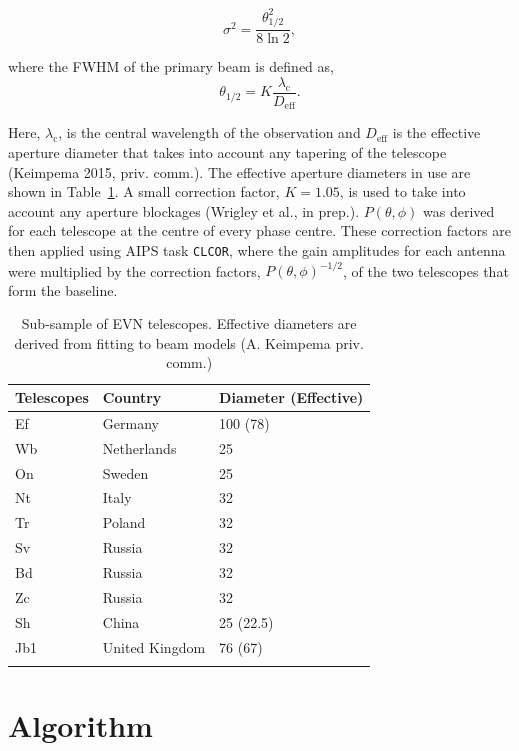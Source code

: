 \documentclass[idxtotoc,hyperref,openany]{article} %
\begin{document}
\begin{equation}
\sigma^2 = \frac{\theta_{1/2}^2}{8\ln{2}},
\end{equation} 

\noindent where the FWHM of the primary beam is defined as,
\begin{equation}
\theta_{1/2} = K\frac{\lambda_{\mathrm{c}}}{D_{\mathrm{eff}}}.
\end{equation}

\noindent Here, $\lambda_{\mathrm{c}}$, is the central wavelength of the observation and $D_{\mathrm{eff}}$ is the effective aperture diameter that takes into account any tapering of the telescope (Keimpema 2015, priv. comm.). The effective aperture diameters in use are shown in Table~\ref{table:telescopes}. A small correction factor, $K = 1.05$, is used to take into account any aperture blockages (Wrigley et al., in prep.). $P(\theta, \phi)$ was derived for each telescope at the centre of every phase centre. These correction factors are then applied using AIPS task \texttt{CLCOR}, where the gain amplitudes for each antenna were multiplied by the correction factors, $P(\theta, \phi)^{-1/2}$, of the two telescopes that form the baseline.

\begin{table}
	\centering  
	\begin{tabular}{lll}
		\hline\hline   \label{table:telescopes} 
		Telescopes & Country & Diameter (Effective)  \\
		\hline
		Ef & Germany & 100 (78) \\
		Wb & Netherlands & 25 \\
		On & Sweden & 25 \\
		Nt & Italy & 32 \\
		Tr & Poland & 32 \\
		Sv & Russia & 32 \\
		Bd & Russia & 32 \\
		Zc & Russia & 32 \\
		Sh & China & 25 (22.5)\\
		Jb1 & United Kingdom & 76 (67)\\
		\hline
		\noalign{\smallskip}
	\end{tabular}
	\caption{Sub-sample of EVN telescopes. Effective diameters are derived from fitting to beam models (A. Keimpema priv. comm.)}   
\end{table}
\section{Algorithm}
\end{document}
